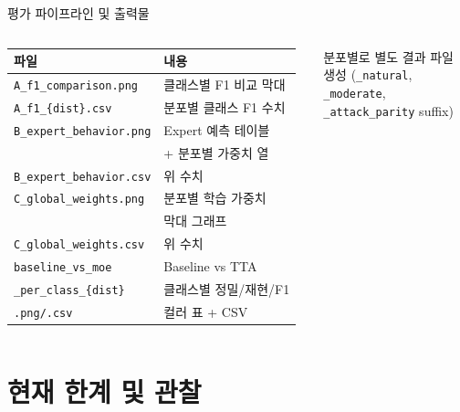 \documentclass[aspectratio=169]{beamer}
\begin{document}
\begin{frame}{평가 파이프라인 및 출력물}
\begin{columns}[T]
\begin{tabular}{ll}
\toprule
파일 & 내용 \\
\midrule
\texttt{A\_f1\_comparison.png} & 클래스별 F1 비교 막대 \\
\texttt{A\_f1\_\{dist\}.csv}   & 분포별 클래스 F1 수치 \\
\texttt{B\_expert\_behavior.png} & Expert 예측 테이블\\
                                 & + 분포별 가중치 열 \\
\texttt{B\_expert\_behavior.csv} & 위 수치 \\
\texttt{C\_global\_weights.png}  & 분포별 학습 가중치\\
                                 & 막대 그래프 \\
\texttt{C\_global\_weights.csv}  & 위 수치 \\
\texttt{baseline\_vs\_moe}       & Baseline vs TTA \\
\texttt{\_per\_class\_\{dist\}} & 클래스별 정밀/재현/F1 \\
\texttt{.png/.csv}               & 컬러 표 + CSV \\
\bottomrule
\end{tabular}

\vspace{0.3em}
{\small 분포별로 별도 결과 파일 생성 (\texttt{\_natural},\\
\texttt{\_moderate}, \texttt{\_attack\_parity} suffix)}
\end{columns}
\end{frame}

\section{현재 한계 및 관찰}
\end{document}
